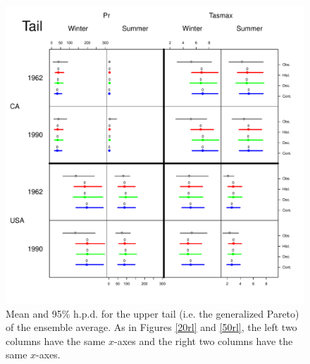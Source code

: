 \begin{figure}
\begin{center}
 \includegraphics[scale=0.72]{figs/tail.pdf}
\end{center}
\caption{Mean and 95\% h.p.d. for the upper tail (i.e. the generalized Pareto) of the ensemble average. As in Figures \ref{20rl} and \ref{50rl}, the left two columns have the same $x$-axes and the right two columns have the same $x$-axes.}
\label{tail}
\end{figure}

